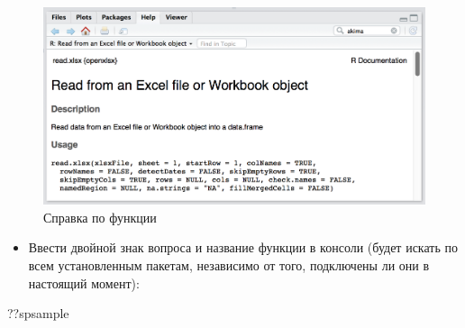 \documentclass[]{book}
\newenvironment{Shaded}{\begin{snugshade}}{\end{snugshade}}
\newcommand{\NormalTok}[1]{#1}
\providecommand{\tightlist}{%
  \setlength{\itemsep}{0pt}\setlength{\parskip}{0pt}}
\begin{document}
\begin{figure}
\centering
\includegraphics{images/ch0_openxlsx.png}
\caption{Справка по функции}
\end{figure}

\begin{itemize}
\tightlist
\item
  Ввести двойной знак вопроса и название функции в консоли (будет искать
  по всем установленным пакетам, независимо от того, подключены ли они в
  настоящий момент):
\end{itemize}

\begin{Shaded}
\begin{Highlighting}[]
\NormalTok{??spsample}
\end{Highlighting}
\end{Shaded}
\end{document}
